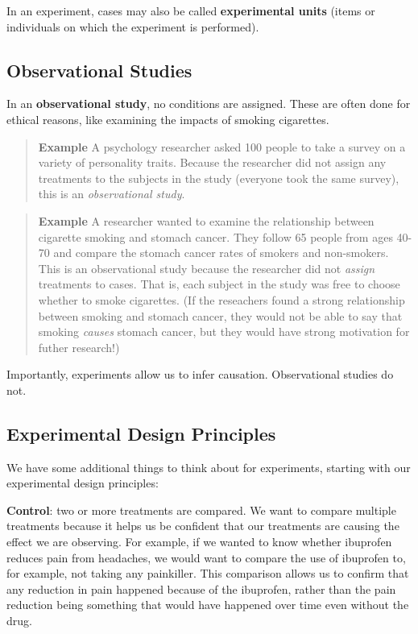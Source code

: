 \documentclass[
]{book}
\begin{document}
In an experiment, cases may also be called \textbf{experimental units} (items or individuals on which the experiment is performed).

\subsection{Observational Studies}\label{observational-studies}

In an \textbf{observational study}, no conditions are assigned. These are often done for ethical reasons, like examining the impacts of smoking cigarettes.

\begin{quote}
\textbf{Example} A psychology researcher asked 100 people to take a survey on a variety of personality traits. Because the researcher did not assign any treatments to the subjects in the study (everyone took the same survey), this is an \emph{observational study}.
\end{quote}

\begin{quote}
\textbf{Example} A researcher wanted to examine the relationship between cigarette smoking and stomach cancer. They follow 65 people from ages 40-70 and compare the stomach cancer rates of smokers and non-smokers. This is an observational study because the researcher did not \emph{assign} treatments to cases. That is, each subject in the study was free to choose whether to smoke cigarettes. (If the reseachers found a strong relationship between smoking and stomach cancer, they would not be able to say that smoking \emph{causes} stomach cancer, but they would have strong motivation for futher research!)
\end{quote}

Importantly, experiments allow us to infer causation. Observational studies do not.

\subsection{Experimental Design Principles}\label{experimental-design-principles}

We have some additional things to think about for experiments, starting with our experimental design principles:

\textbf{Control}: two or more treatments are compared. We want to compare multiple treatments because it helps us be confident that our treatments are causing the effect we are observing. For example, if we wanted to know whether ibuprofen reduces pain from headaches, we would want to compare the use of ibuprofen to, for example, not taking any painkiller. This comparison allows us to confirm that any reduction in pain happened because of the ibuprofen, rather than the pain reduction being something that would have happened over time even without the drug.
\end{document}

